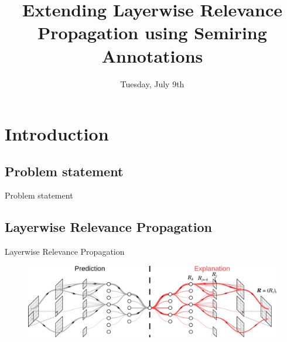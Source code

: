 \documentclass[aspectratio=169]{beamer}
\title{\textbf{Extending Layerwise Relevance Propagation using Semiring Annotations}}
\author{%
  \texorpdfstring{%
    \begin{columns}
      \column{.5\linewidth}
      \centering
      \textbf{Antoine Groudiev} \\ L3, ENS Ulm
      \column{.5\linewidth}
      \centering
      \textbf{Silviu Maniu} -- Supervisor \\ SLIDE Team, LIG
    \end{columns}
 }
 {Antoine Groudiev, Silviu Maniu}
}
\date{Tuesday, July 9th}
\theoremstyle{definition}
\begin{document}
\frame{\titlepage}


\section{Introduction}
\subsection{Problem statement}
\begin{frame}{Problem statement}
    \begin{figure}
        \centering
    \end{figure}
\end{frame}

\subsection{Layerwise Relevance Propagation}
\begin{frame}{Layerwise Relevance Propagation}
    \begin{figure}[H]
        \includegraphics[width=\textwidth]{LRP.png}
    \end{figure}
\end{frame}
\end{document}
